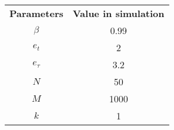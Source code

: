 \renewcommand{\arraystretch}{1.5}

\vspace{5mm}
\begin{tabular}{|| c | c ||}
    \textbf{Parameters} & \textbf{Value in simulation} \\
    $\beta$             & 0.99                         \\
    $e_t$               & 2                            \\
    $e_\tau$            & 3.2                          \\
    $N$                 & 50                           \\
    $M$                 & 1000                         \\
    $k$                 & 1
\end{tabular}
\vspace{5mm}
